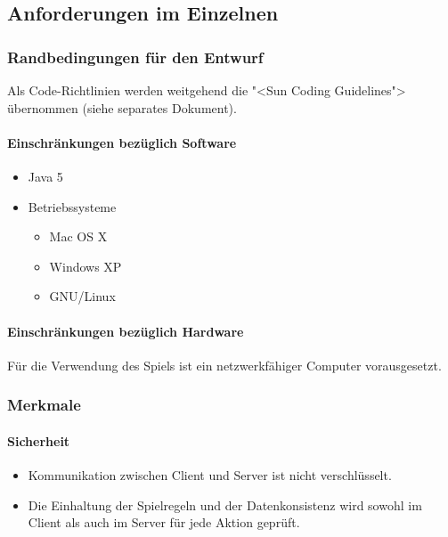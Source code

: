 \documentclass[a4paper,12pt,halfparskip,DIV14]{scrartcl}
\begin{document}
\subsection{Anforderungen im Einzelnen}\label{sub:anforderungen_im_einzelnen} %
\subsubsection{Randbedingungen für den Entwurf}\label{ssub:randbedingungen_für_den_entwurf} %

Als Code-Richtlinien werden weitgehend die "<Sun Coding Guidelines"> übernommen (siehe separates Dokument).

\paragraph{Einschränkungen bezüglich Software}\label{ssub:einschränkungen_bzgl_software} %
\begin{itemize}
	\item Java 5
	\item Betriebssysteme
	\begin{itemize}
		\item Mac OS X
		\item Windows XP
		\item GNU/Linux
	\end{itemize}
\end{itemize}


\paragraph{Einschränkungen bezüglich Hardware}\label{ssub:einschränkungen_bzgl_hardware} %

Für die Verwendung des Spiels ist ein netzwerkfähiger Computer vorausgesetzt.


\subsubsection{Merkmale}\label{ssub:merkmale} %
\paragraph{Sicherheit}\label{ssub:sicherheit} %
\begin{itemize}
	\item Kommunikation zwischen Client und Server ist nicht verschlüsselt.
	\item Die Einhaltung der Spielregeln und der Datenkonsistenz wird sowohl im Client als auch im Server für jede Aktion geprüft.
\end{itemize}
\end{document}
